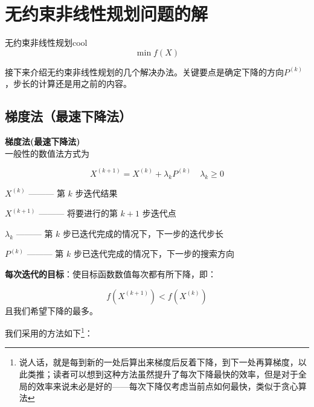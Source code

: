 \section{无约束非线性规划问题的解}
\begin{thmbox}{无约束非线性规划}{cool}
$$
\min f(X) 
$$
\end{thmbox}
接下来介绍无约束非线性规划的几个解决办法。关键要点是确定下降的方向$P^{(k)}$，步长的计算还是用之前的内容。
\subsection{梯度法（最速下降法）}

\begin{notebox}{\textbf{梯度法(最速下降法)}}{}\\
    \noindent 一般性的数值法方式为

    \[
    X^{(k+1)} = X^{(k)} + \lambda_k P^{(k)} \quad \lambda_k \geq 0
    \]

    \bigskip
    \noindent $X^{(k)}$ ——— 第 $k$ 步迭代结果

    \bigskip
    \noindent $X^{(k+1)}$ ——— 将要进行的第 $k+1$ 步迭代点

    \bigskip
    \noindent $\lambda_k$ ——— 第 $k$ 步已迭代完成的情况下，下一步的迭代步长

    \bigskip
    \noindent $P^{(k)}$ ——— 第 $k$ 步已迭代完成的情况下，下一步的搜索方向

    \bigskip
    \noindent \textbf{每次迭代的目标}：使目标函数数值每次都有所下降，即：

    \[
    f(X^{(k+1)}) < f(X^{(k)})
    \]
    且我们希望下降的最多。
\end{notebox}
我们采用的方法如下\footnote{说人话，就是每到新的一处后算出来梯度后反着下降，到下一处再算梯度，以此类推；读者可以想到这种方法虽然提升了每次下降最快的效率，但是对于全局的效率来说未必是好的——每次下降仅考虑当前点如何最快，类似于贪心算法}：
